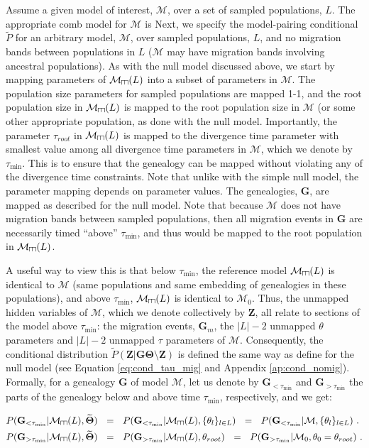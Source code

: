 \documentclass[11pt]{article}
\newcommand{\vect}[1]{\boldsymbol{\mathbf{#1}}}
\newcommand{\M}{\mathcal{M}}
\newcommand{\G}{\vect{G}}
\newcommand{\T}{\vect{\Theta}}
\newcommand{\GT}{\G\T}
\newcommand{\Pref}{\widetilde{P}}
\newcommand{\Tref}{\widetilde{\T}}
\newcommand{\Z}{\vect{Z}}
\newcommand{\troot}{\theta_{root}}
\newcommand{\Gm}{\G_m}
\def\comb{\rotatebox[origin=c]{90}{$\exists$}}
\newcommand{\Mcomb}{\M_{\comb}}
\newcommand{\tmin}{\tau_{\text{min}}}
\begin{document}
Assume a given model of interest, $\M$, over a set of sampled populations, $L$. The appropriate comb model for $\M$ is 
Next, we specify the model-pairing conditional $\Pref$ for an arbitrary model, $\M$, over sampled populations, $L$, and no migration bands
between populations in $L$ ($\M$ may have migration bands involving ancestral populations). As with the null model discussed above, we start
by mapping parameters of $\Mcomb(L)$ into a subset of parameters in $\M$. The population size parameters for sampled populations are mapped
1-1, and the root population size in $\Mcomb(L)$ is mapped to the root population size in $\M$ (or some other appropriate population, as done
with the null model. Importantly, the parameter $\tau_{root}$ in $\Mcomb(L)$ is mapped to the divergence time parameter with smallest value
among all divergence time parameters in $\M$, which we denote by $\tmin$. This is to ensure that the genealogy can be mapped without violating any of the divergence time
constraints. Note that unlike with the simple null model, the parameter mapping depends on parameter values. The genealogies, $\G$, are mapped
as described for the null model. Note that because $\M$ does not have migration bands between sampled populations, then all migration events
in $\G$ are necessarily timed ``above'' $\tmin$, and thus would be mapped to the root population in $\Mcomb(L)$.

A useful way to view this is that below $\tmin$, the reference model $\Mcomb(L)$ is identical to $\M$ (same populations and same embedding of
genealogies in these populations), and above $\tmin$, $\Mcomb(L)$ is identical to $\M_0$.
%
Thus, the unmapped hidden variables of $\M$, which we denote collectively by $\Z$, all relate to sections of the model above $\tmin$:
the migration events, $\Gm$, the $|L|-2$ unmapped $\theta$ parameters and $|L|-2$ unmapped $\tau$ parameters of $\M$.
%
Consequently, the conditional distribution $\Pref(\Z|\GT\setminus\Z)$ is defined the same way as define for the null model
(see Equation \ref{eq:cond_tau_mig} and Appendix \ref{ap:cond_nomig}).
%
Formally, for a genealogy $\G$ of model $\M$, let us denote by $\G_{<\tmin}$ and $\G_{>\tmin}$ the parts of the genealogy below and above time $\tmin$,
respectively, and we get:
%
\begin{small}
\begin{align}
P(\G_{<\tmin}|\Mcomb(L),\Tref) ~~&=~~ P(\G_{<\tmin}|\Mcomb(L),\{\theta_l\}_{l\in L}) ~~=~~ 
P(\G_{<\tmin}|\M,\{\theta_l\}_{l\in L}) ~. \label{eq:comb_lt_tmin}\\
%
P(\G_{>\tmin}|\Mcomb(L),\Tref) ~~&=~~ P(\G_{>\tmin}|\Mcomb(L),\troot) ~~=~~ 
P(\G_{>\tmin}|\M_0,\theta_0=\troot) ~. \label{eq:comb_gt_tmin}
\end{align}
\end{small}
\end{document}
